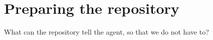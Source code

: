 \section[Repository]{Preparing the repository}
  {What can the repository tell the agent, so that we do not have to?}
  {\faFolderOpen}

